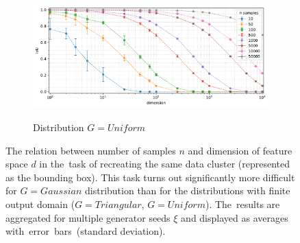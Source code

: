 \begin{figure}[t]
    \vspace{-0.75em}
    \begin{subfigure}[b]{0.9\textwidth}
        \centering
        \caption{\small Distribution $G = Uniform$}
        \includegraphics[width=\textwidth]{images/overlapping/trend-overlapping-IoU(dimension)-distribution_uniform-samples_10,50,100,500,1000,5000,10000,50000-aggregated.pdf}
        \label{fig:iou-uniform}
    \end{subfigure}

    \vspace{-0.5em}
    \caption{The relation between number of samples $n$ and dimension of feature space $d$ in the~task of recreating the same data cluster (represented as the bounding box). This task turns out significantly more difficult for $G = Gaussian$ distribution than for the distributions with finite output domain ($G = Triangular$, $G = Uniform$). The~results are aggregated for multiple generator seeds $\xi$ and displayed as averages with~error~bars~(standard deviation).}
    \label{fig:overlapping-1}
    \vspace{-3.2em}
\end{figure}


